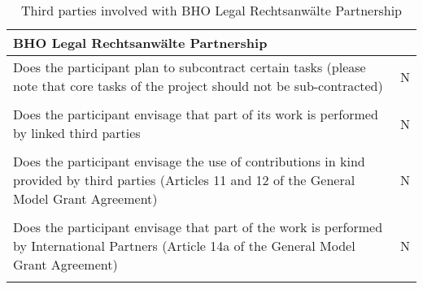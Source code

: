 \begin{table}[H]
	\centering
	\begin{tabular}{|p{10cm}|p{4cm}|}
		\hline
		
		\multicolumn{2}{|p{14cm}|}{\textbf{BHO Legal Rechtsanwälte Partnership}}\\
		
		\hline
		
		Does the participant plan to subcontract certain tasks (please note that core tasks of the project should not be sub-contracted) & N\\
		
		\hline
		
		\multicolumn{2}{|p{14cm}|}{}\\
		
		\hline
		
		Does the participant envisage that part of its work is performed by linked third parties & N\\
		
		\hline
		
		\multicolumn{2}{|p{14cm}|}{}\\
		
		\hline
		
		Does the participant envisage the use of contributions in kind provided by third parties (Articles 11 and 12 of the General Model Grant Agreement) & N\\
		
		\hline
		
		\multicolumn{2}{|p{14cm}|}{}\\
		
		\hline
		
		Does the participant envisage that part of the work is performed by International Partners (Article 14a of the General Model Grant Agreement) & N\\
		
		\hline
		
		\multicolumn{2}{|p{14cm}|}{}\\
		
		\hline
	\end{tabular}
	\caption{Third parties involved with BHO Legal Rechtsanwälte Partnership}
\end{table}



